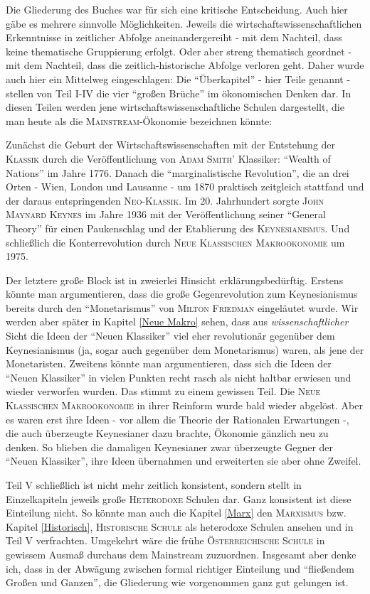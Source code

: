 Die Gliederung des Buches war für sich eine kritische Entscheidung. Auch hier gäbe es mehrere sinnvolle Möglichkeiten. Jeweils die wirtschaftswissenschaftlichen Erkenntnisse in zeitlicher Abfolge aneinandergereiht - mit dem Nachteil, dass keine thematische Gruppierung erfolgt. Oder aber streng thematisch geordnet - mit dem Nachteil, dass die zeitlich-historische Abfolge verloren geht. Daher wurde auch hier ein Mittelweg eingeschlagen: Die "`Überkapitel"' - hier Teile genannt - stellen von Teil I-IV die vier "`großen Brüche"' im ökonomischen Denken dar. In diesen Teilen werden jene wirtschaftswissenschaftliche Schulen dargestellt, die man heute als die \textsc{Mainstream}-Ökonomie bezeichnen könnte:

Zunächst die Geburt der Wirtschaftswissenschaften mit der Entstehung der \textsc{Klassik} durch die Veröffentlichung von \textsc{Adam Smith'} Klassiker: "`Wealth of Nations"' im Jahre 1776. Danach die "`marginalistische Revolution"', die an drei Orten - Wien, London und Lausanne - um 1870 praktisch zeitgleich stattfand und der daraus entspringenden \textsc{Neo-Klassik}. Im 20. Jahrhundert sorgte \textsc{John Maynard Keynes} im Jahre 1936 mit der Veröffentlichung seiner "`General Theory"' für einen Paukenschlag und der Etablierung des \textsc{Keynesianismus}. Und schließlich die Konterrevolution durch \textsc{Neue Klassischen Makroökonomie} um 1975.

Der letztere große Block ist in zweierlei Hinsicht erklärungsbedürftig. Erstens könnte man argumentieren, dass die große Gegenrevolution zum Keynesianismus bereits durch den "`Monetarismus"' von \textsc{Milton Friedman} eingeläutet wurde. Wir werden aber später in Kapitel \ref{Neue Makro} sehen, dass aus \textit{wissenschaftlicher} Sicht die Ideen der "`Neuen Klassiker"' viel eher revolutionär gegenüber dem Keynesianismus (ja, sogar auch gegenüber dem Monetarismus) waren, als jene der Monetaristen. Zweitens könnte man argumentieren, dass sich die Ideen der "`Neuen Klassiker"' in vielen Punkten recht rasch als nicht haltbar erwiesen und wieder verworfen wurden. Das stimmt zu einem gewissen Teil. Die \textsc{Neue Klassischen Makroökonomie} in ihrer Reinform wurde bald wieder abgelöst. Aber es waren erst ihre Ideen -  vor allem die Theorie der Rationalen Erwartungen -, die auch überzeugte Keynesianer dazu brachte, Ökonomie gänzlich neu zu denken. So blieben die damaligen Keynesianer zwar überzeugte Gegner der "`Neuen Klassiker"', ihre Ideen übernahmen und erweiterten sie aber ohne Zweifel.

Teil V schließlich ist nicht mehr zeitlich konsistent, sondern stellt in Einzelkapiteln jeweils große \textsc{Heterodoxe} Schulen dar. Ganz konsistent ist diese Einteilung nicht. So könnte man auch die Kapitel \ref{Marx} den \textsc{Marxismus} bzw. Kapitel \ref{Historisch},  \textsc{Historische Schule} als heterodoxe Schulen ansehen und in Teil V verfrachten. Umgekehrt wäre die frühe \textsc{Österreichische Schule} in gewissem Ausmaß durchaus dem Mainstream zuzuordnen. Insgesamt aber denke ich, dass in der Abwägung zwischen formal richtiger Einteilung und "`fließendem Großen und Ganzen"', die Gliederung wie vorgenommen ganz gut gelungen ist.

